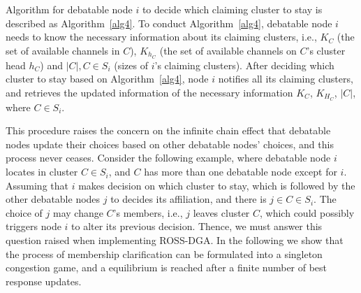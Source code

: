 \documentclass[10pt,journal,compsoc]{IEEEtran}
\theoremstyle{mytheoremstyle}
\theoremstyle{mytheoremstyle}
\theoremstyle{mytheoremstyle}
\newcommand{\ie}{i.e., }
\begin{document}
Algorithm for debatable node $i$ to decide which claiming cluster to stay is described as Algorithm~\ref{alg4}.
To conduct Algorithm~\ref{alg4}, debatable node $i$ needs to know the necessary information about its claiming clusters, \ie $K_C$ (the set of available channels in $C$), $K_{h_C}$ (the set of available channels on $C$'s cluster head $h_C$) and $|C|, C\in S_i$ (sizes of $i$'s claiming clusters).
After deciding which cluster to stay based on Algorithm~\ref{alg4}, node $i$ notifies all its claiming clusters, and retrieves the updated information of the necessary information $K_C$, $K_{H_C}$, $|C|$, where $C\in S_i$.



This procedure raises the concern on the infinite chain effect that debatable nodes update their choices based on other debatable nodes' choices, and this process never ceases.
Consider the following example, where debatable node $i$ locates in cluster $C\in S_i$, and $C$ has more than one debatable node except for $i$.
Assuming that $i$ makes decision on which cluster to stay, which is followed by the other debatable nodes $j$ to decides its affiliation, and there is $j\in C\in S_i$.
The choice of $j$ may change $C$'s members, \ie $j$ leaves cluster $C$, which could possibly triggers node $i$ to alter its previous decision.
Thence, we must answer this question raised when implementing ROSS-DGA.
In the following we show that the process of membership clarification can be formulated into a singleton congestion game, and a equilibrium is reached after a finite number of best response updates.
\end{document}
